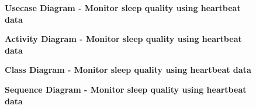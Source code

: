 \documentclass{article}
\begin{document}
	
		\begin{figure}[htbp]
			\centering
			\textbf{Usecase Diagram - Monitor sleep quality using heartbeat data}
			\begin{subfigure}{\textwidth}
				\centering
				
			\end{subfigure}
			\begin{subfigure}{\textwidth}
			\end{subfigure}
		\end{figure}
		\clearpage
		
		\begin{figure}[htbp]
			\centering
			\textbf{Activity Diagram - Monitor sleep quality using heartbeat data}
			\begin{subfigure}{\textwidth}
				\centering
				
			\end{subfigure}
			\begin{subfigure}{\textwidth}
			\end{subfigure}
		\end{figure}
		\clearpage
		
		\begin{figure}[htbp]
			\centering
			\textbf{Class Diagram - Monitor sleep quality using heartbeat data}
			\begin{subfigure}{\textwidth}
				
			\end{subfigure}
			\begin{subfigure}{\textwidth}
				\vspace{1em}
				\end{subfigure}
		\end{figure}
		\clearpage
	
		
		\begin{figure}[htbp]
			\centering
			\textbf{Sequence Diagram - Monitor sleep quality using heartbeat data}
			\begin{subfigure}{\textwidth}
				\centering
				
			\end{subfigure}
			\begin{subfigure}{\textwidth}
			
			\end{subfigure}
		\end{figure} 
		\clearpage
	
	
\end{document}
